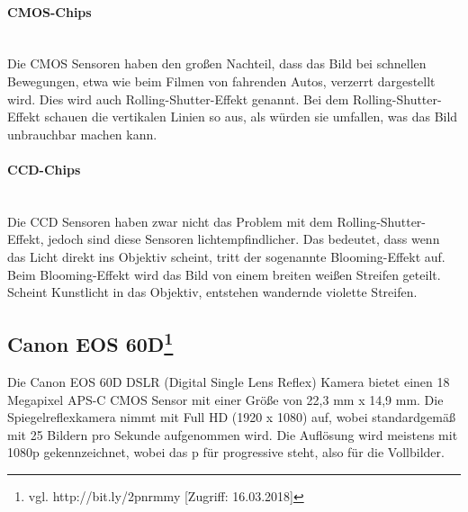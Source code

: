 \paragraph{CMOS-Chips}
\leavevmode \\
Die CMOS Sensoren haben den großen Nachteil, dass das Bild bei schnellen Bewegungen, etwa wie beim Filmen von fahrenden Autos, verzerrt dargestellt wird. Dies wird auch Rolling-Shutter-Effekt genannt. Bei dem Rolling-Shutter-Effekt schauen die vertikalen Linien so aus, als würden sie umfallen, was das Bild unbrauchbar machen kann.
\paragraph{CCD-Chips}
\leavevmode \\
Die CCD Sensoren haben zwar nicht das Problem mit dem Rolling-Shutter-Effekt, jedoch sind diese Sensoren lichtempfindlicher. Das bedeutet, dass wenn das Licht direkt ins Objektiv scheint, tritt der sogenannte Blooming-Effekt auf. Beim Blooming-Effekt wird das Bild von einem breiten weißen Streifen geteilt. Scheint Kunstlicht in das Objektiv, entstehen wandernde violette Streifen.
\subsection[Canon EOS 60D]{Canon EOS 60D\protect\footnote{\label{}vgl. http://bit.ly/2pnrmmy [Zugriff: 16.03.2018]}} Die Canon EOS 60D DSLR (Digital Single Lens Reflex) Kamera bietet einen 18 Megapixel APS-C CMOS Sensor mit einer Größe von 22,3 mm x 14,9 mm. Die Spiegelreflexkamera nimmt mit Full HD (1920 x 1080) auf, wobei standardgemäß mit 25 Bildern pro Sekunde aufgenommen wird. Die Auflösung wird meistens mit 1080p gekennzeichnet, wobei das p für progressive steht, also für die Vollbilder.
